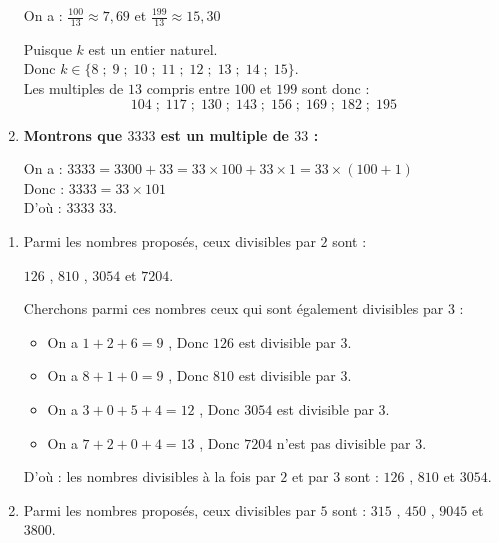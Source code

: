 \documentclass[10pt, a4paper]{article}
\begin{document}
\begin{multicols*}{2}
\begin{Solution}[APPLICATION][4]
\begin{enumerate}[leftmargin=*,itemsep=0.5pt]
    On a : $\frac{100}{13} \approx 7{,}69$ \quad et \quad $\frac{199}{13} \approx 15{,}30$

    Puisque $k$ est un entier naturel. \\
    Donc $k \in \big\{8 \; ; \; 9 \; ; \; 10 \; ; \; 11 \; ; \; 12 \; ; \; 13 \; ; \; 14 \; ; \; 15\big\}$. \\
    Les multiples de $13$ compris entre $100$ et $199$ sont donc : \\
    \[104 \; ; \; 117 \; ; \; 130 \; ; \; 143 \; ; \; 156 \; ; \; 169 \; ; \; 182 \; ; \; 195\]

    \item \textbf{Montrons que $3333$ est un multiple de $33$ :}

    On a :
    $3333 = 3300 + 33 = 33 \times 100 + 33 \times 1 = 33 \times (100 + 1)$ \\
    Donc : $3333 = 33 \times 101$ \\
    D'où : \quad $3333$  $33$.
\end{enumerate}
\end{Solution}

\begin{Solution}[APPLICATION][5]
\begin{enumerate}[leftmargin=*,itemsep=0.5pt]
    \item Parmi les nombres proposés, ceux divisibles par $2$ sont :

    $126$ , $810$  , $3054$ et $7204$.

    Cherchons parmi ces nombres ceux qui sont également divisibles par $3$ :
    \begin{itemize}[leftmargin=*,itemsep=0.5pt]
        \item On a $1+2+6 = 9$ , Donc $126$ est divisible par $3$.
        \item On a $8+1+0 = 9$ , Donc $810$ est divisible par $3$.
        \item On a $3+0+5+4 = 12$ , Donc $3054$ est divisible par $3$.
        \item On a $7+2+0+4 = 13$ , Donc $7204$ n'est pas divisible par $3$.
    \end{itemize}

    D'où : \quad les nombres divisibles à la fois par $2$ et par $3$ sont : $126$ , $810$ et $3054$.

    \item Parmi les nombres proposés, ceux divisibles par $5$ sont : $315$ , $450$ , $9045$ et $3800$.


\end{enumerate}
\end{Solution}
\end{multicols*}
\end{document}
